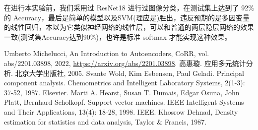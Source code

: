\documentclass[fleqn]{Paquetes/RevDigMatEduInt}
\begin{document}
在进行本实验前，我们采用过 ResNet18 进行过图像分类，在测试集上达到了 92\% 的 Accuracy，最后是简单的模型以及SVM(理应是)胜出，违反预期的是多因变量的线性回归，本以为它类似神经网络的线性层，可以和普通的两层隐层网络的效果一致(测试集Accuracy达到90\%)，也许是标准 softmax 才能实现这种效果。

\begin{thebibliography}{AAAAA}
	 Umberto Michelucci,
	An Introduction to Autoencoders,
	CoRR,
	vol. abs/2201.03898,
	2022,
	\url{https://arxiv.org/abs/2201.03898}.
	高惠璇. 应用多元统计分析. 北京大学出版社, 2005.
	Svante Wold, Kim Esbensen, Paul Geladi.
	Principal component analysis.
	Chemometrics and Intelligent Laboratory Systems, 2(1-3): 37-52, 1987.
	Elsevier.
	Marti A. Hearst, Susan T. Dumais, Edgar Osuna, John Platt, Bernhard Scholkopf.
	Support vector machines.
	IEEE Intelligent Systems and Their Applications, 13(4): 18-28, 1998.
	IEEE.
	 Khosrow Dehnad, Density estimation for statistics and data analysis, Taylor \& Francis, 1987.
	
	
\end{thebibliography}
\end{document}
